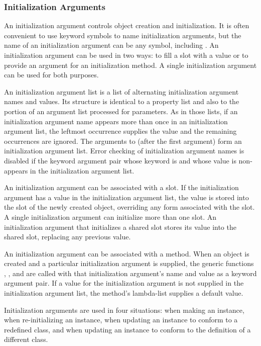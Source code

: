 \subsubsection{Initialization Arguments}

An initialization argument controls object creation and
initialization.  It is often convenient to use keyword symbols to name
initialization arguments, but the name of an initialization argument
can be any symbol, including .  An initialization argument
can be used in two ways: to fill a slot with a value or to provide an
argument for an initialization method.  A single initialization
argument can be used for both purposes.

An {\bit initialization argument list\/} is a list of alternating
initialization argument names and values.  Its structure is identical
to a property list and also to the portion of an argument list
processed for  parameters.  As in those lists, if an
initialization argument name appears more than once in an
initialization argument list, the leftmost occurrence supplies the
value and the remaining occurrences are ignored.  The arguments to
 (after the first argument) form an initialization
argument list.  Error checking of initialization argument names is
disabled if the keyword argument pair whose keyword is 
 and whose value is non- appears in the
initialization argument list.

An initialization argument can be associated with a slot.  If the
initialization argument has a value in the initialization argument
list, the value is stored into the slot of the newly created object,
overriding any  form associated with the slot.  A
single initialization argument can initialize more than one slot.  An
initialization argument that initializes a shared slot stores its
value into the shared slot, replacing any previous value.

An initialization argument can be associated with a method.  When an
object is created and a particular initialization argument is
supplied, the generic functions , 
, and  are called with that
initialization argument's name and value as a keyword argument pair.
If a value for the initialization argument is not supplied in the
initialization argument list, the method's lambda-list supplies a
default value.

Initialization arguments are used in four situations: when making an
instance, when re-initializing an instance, when updating an instance to
conform to a redefined class, and when updating an instance to conform
to the definition of a different class.

